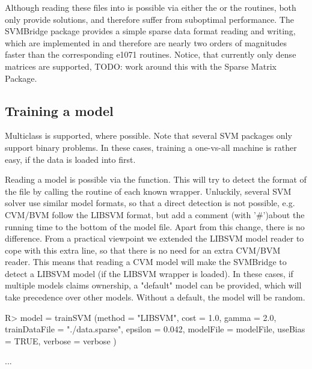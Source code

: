 \documentclass[article, shortnames]{jss}
\begin{document}
Although reading these files into  is possible via either
the  or the  routines, both only provide  solutions,
and therefore suffer from suboptimal performance.
The SVMBridge package provides a simple sparse data format 
reading and writing, which are implemented in  and
therefore are nearly two orders of magnitudes faster than
the corresponding e1071 routines.
Notice, that currently only dense matrices are supported,
TODO: work around this with the Sparse Matrix Package.



\subsection{Training a model}

Multiclass is supported, where possible.
Note that several SVM packages only support binary problems.
In these cases, training a one-vs-all machine is rather easy, if the
data is loaded into  first. 


Reading a model is possible via the  function.
This will try to detect the format of the file by calling the 
 routine of each known wrapper.
Unluckily, several SVM solver use similar model formats, so that
a direct detection is not possible, e.g. CVM/BVM follow the LIBSVM
format, but add a comment (with '\#')about the running time to the
bottom of the model file. Apart from this change, there is no difference.
From a practical viewpoint we extended the LIBSVM model reader
to cope with this extra line, so that there is no need for an extra CVM/BVM reader.
This means that reading a CVM model will make the SVMBridge to detect a LIBSVM
model (if the LIBSVM wrapper is loaded).
In these cases, if multiple models claims ownership, a "default" model can be provided,
which will take precedence over other models. Without a default,
the model will be random.

\begin{CodeChunk}
\begin{CodeInput}
R> model = trainSVM (method = "LIBSVM", cost = 1.0, gamma = 2.0,
			trainDataFile = "./data.sparse",
			epsilon = 0.042,
			modelFile = modelFile,
			useBias = TRUE,
			verbose = verbose
		)
\end{CodeInput}
\begin{CodeOutput}
...
\end{CodeOutput}
\end{CodeChunk}
\end{document}
